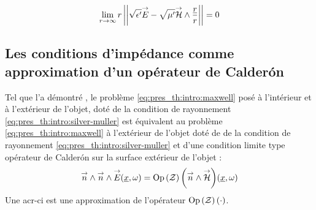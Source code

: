 \begin{equation}
\label{eq:pres_th:intro:silver-muller}
\lim_{r\rightarrow\infty} r \left|\left|\sqrt{\epsilon'}{\overset{\rightarrow}{E}} - \sqrt{\mu'}{\overset{\rightarrow}{\mathcal{H}}}\wedge\dfrac{\underline{r}}{r}\right|\right| = 0
\end{equation} 

\subsection*{Les conditions d'impédance comme approximation d'un opérateur de Calderón}

Tel que l'a démontré \cite[p.~109]{cessenat_mathematical_1996}, le problème \eqref{eq:pres_th:intro:maxwell}  posé à l'intérieur et à l'extérieur de l'objet, doté de la condition de rayonnement \eqref{eq:pres_th:intro:silver-muller} est équivalent au problème \eqref{eq:pres_th:intro:maxwell} à l'extérieur de l'objet doté de de la condition de rayonnement \eqref{eq:pres_th:intro:silver-muller} et d'une condition limite type opérateur de Calderón sur la surface extérieur de l'objet : 
\begin{equation}
\label{eq:pres_th:ci:ci-calderon}
{\overset{\rightarrow}{n}} \wedge {\overset{\rightarrow}{n}} \wedge {\overset{\rightarrow}{E}} (\underline{x} , \omega ) = {\operatorname{Op}\left(\mathcal Z\right)\left({\overset{\rightarrow}{n}} \wedge {\overset{\rightarrow}{\mathcal{H}}} \right)}(\underline{x}, \omega )
\end{equation}
Une \gls{acr-ci} est une approximation de l'opérateur ${\operatorname{Op}\left(\mathcal Z\right)\left(\cdot\right)}$.







